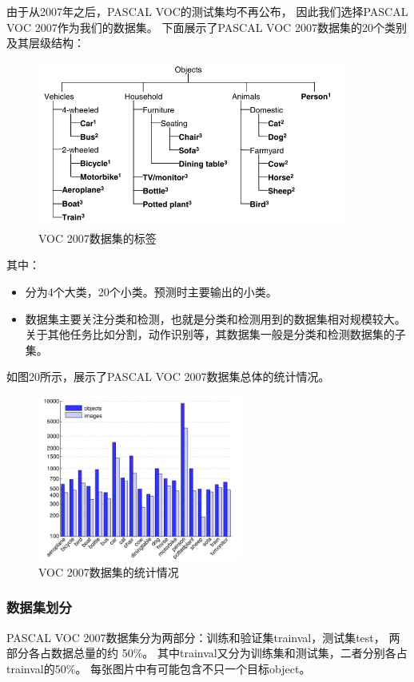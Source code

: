 \documentclass[UTF8]{ctexart}
\begin{document}
由于从2007年之后，PASCAL VOC的测试集均不再公布，
因此我们选择PASCAL VOC 2007作为我们的数据集。
下面展示了PASCAL VOC 2007数据集的20个类别及其层级结构：
\begin{figure}[htbp]
    \centering
    \includegraphics[width=0.90\textwidth]{../img/VOC2007-classes.png}
    \caption{VOC 2007数据集的标签}
\end{figure}

其中：
\begin{itemize}
    \item 分为4个大类，20个小类。预测时主要输出的小类。
    \item 数据集主要关注分类和检测，也就是分类和检测用到的数据集相对规模较大。关于其他任务比如分割，动作识别等，其数据集一般是分类和检测数据集的子集。
\end{itemize}

如图20所示，展示了PASCAL VOC 2007数据集总体的统计情况。
\begin{figure}[htbp]
    \centering
    \includegraphics[width=0.60\textwidth]{../img/VOC2007-histogram.png}
    \caption{VOC 2007数据集的统计情况}
\end{figure}

\subsubsection{数据集划分}
PASCAL VOC 2007数据集分为两部分：训练和验证集trainval，测试集test，
两部分各占数据总量的约 50\%。
其中trainval又分为训练集和测试集，二者分别各占trainval的50\%。
每张图片中有可能包含不只一个目标object。
\end{document}
